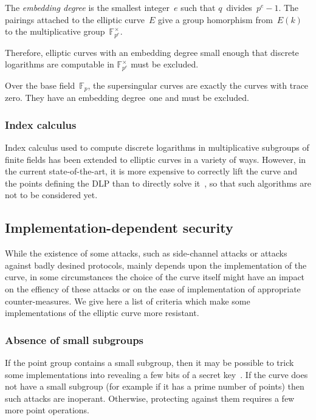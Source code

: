 \documentclass[twocolumn,letterpaper,10pt]{article}
\def\F{\mathbb{F}}
\begin{document}
The \emph{embedding degree} is the smallest integer~$e$ such that
$q$~divides~$p^e -1$.
The pairings attached to the elliptic curve~$E$
give a group homorphism from~$E(k)$
to the multiplicative group~$\F_{p^e}^{×}$.

Therefore, elliptic curves with an embedding degree small enough
that discrete logarithms are computable in $\F_{p^e}^{×}$
must be excluded.

Over the base field~$\F_p$, the supersingular curves
are exactly the curves with trace zero.
They have an embedding degree~one and must be excluded.

\subsubsection{Index calculus}

Index calculus used to compute discrete logarithms in multiplicative subgroups
of finite fields has been extended to elliptic curves in a variety of ways.
However, in the current state-of-the-art, it is more expensive
to correctly lift the curve and the points defining the DLP than
to directly solve it~\cite{asia1998ss,dcc2000silverman,dcc2000ksst,ecc2007silverman,sac2008silverman},
so that such algorithms are not to be considered yet.

\subsection{Implementation-dependent security}
\label{ss:side}

While the existence of some attacks,
such as side-channel attacks or attacks against badly desined protocols,
mainly depends upon the implementation of the curve,
in some circumstances the choice of the curve itself
might have an impact on the effiency of these attacks
or on the ease of implementation of appropriate counter-measures.
We give here a list of criteria
which make some implementations of the elliptic curve more resistant.

\subsubsection{Absence of small subgroups}
\label{sss:small-subgroup}

If the point group contains a small subgroup,
then it may be possible to trick some implementations
into revealing a few bits of a secret key~\cite{crypto1997ll}.
If the curve does not have a small subgroup
(for example if it has a prime number of points)
then such attacks are inoperant.
Otherwise, protecting against them requires a few more point operations.
\end{document}

